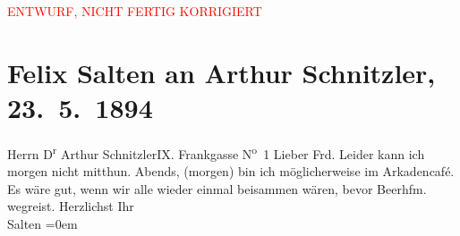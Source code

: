
\begin{center}
            \textcolor{red}{ENTWURF, NICHT FERTIG KORRIGIERT}
                      \end{center}
            
         
         \renewcommand{\erwaehntePersonen}{Personen: Richard Beer-Hofmann}
         \renewcommand{\erwaehnteOrte}{Orte: Café Arkaden, Frankgasse, I., Innere Stadt, IX., Alsergrund, Wien}
         \renewcommand{\erwaehnteWerke}{}
               \section[Felix Salten an Arthur Schnitzler, 23. 5. 1894]{ Felix Salten an Arthur Schnitzler, 23. 5. 1894}\nopagebreak{}\rehead{ }\begin{ledgroupsized}[t]{13cm}\normalsize\beginnumbering \toendnotes[C]{\smallbreak\pagebreak[2]} 
\pstart{}{\pb}Herrn D\textsuperscript{r} Arthur Schnitzler\pend{}\pstart{}IX. Frankgasse N\textsuperscript{o} 1\pend{}{\bigskip}\pstart
           \noindent{}{\pb}Lieber Frd. Leider kann ich morgen nicht mitthun. Abends, (morgen)
               bin ich möglicherweise im Arkadencafé. Es wäre
               gut, wenn wir alle wieder einmal beisammen wären, bevor Beerhfm. wegreist. \pend
           \pstart
           Herzlichst Ihr {\\[\baselineskip]}\spacefill\mbox{Salten}\pend
           \leftskip=0em{}
         
         \endnumbering{}\end{ledgroupsized}\begin{anhang}\end{anhang}\newcommand{\dateiname}{L03136}\newcommand{\titel}{Felix Salten an Arthur Schnitzler, 23. 5. 1894}\newcommand{\editorInnen}{Martin Anton Müller und Laura Untner}
      